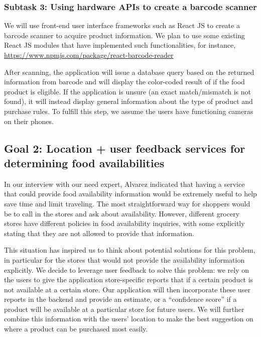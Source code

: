 \documentclass{article}
\begin{document}
\subsubsection*{Subtask 3: Using hardware APIs to create a barcode scanner}\label{sec:goal13}
We will use front-end user interface frameworks such as React JS to create a barcode scanner to acquire product information.  We plan to use some existing React JS modules that have implemented such functionalities, for instance, \href{https://www.npmjs.com/package/react-barcode-reader}{https://www.npmjs.com/package/react-barcode-reader}\par
After scanning, the application will issue a database query based on the returned information from barcode and will display the color-coded result of if the food product is eligible. If the application is unsure (an exact match/mismatch is not found), it will instead display general information about the type of product and purchase rules. To fulfill this step, we assume the users have functioning cameras on their phones.

\subsection*{Goal 2: Location + user feedback services for determining food availabilities}
\label{sec:goal2}
In our interview with our need expert, Alvarez indicated that having a service that could provide food availability information would be extremely useful to help save time and limit traveling. The most straightforward way for shoppers would be to call in the stores and ask about availability. However, different grocery stores have different policies in food availability inquiries, with some explicitly stating that they are not allowed to provide that information. \par
This situation has inspired us to think about potential solutions for this problem, in particular for the stores that would not provide the availability information explicitly. We decide to leverage user feedback to solve this problem: we rely on the users to give the application store-specific reports that if a certain product is not available at a certain store. Our application will then incorporate these user reports in the backend and provide an estimate, or a ``confidence score'' if a product will be available at a particular store for future users. We will further combine this information with the users’ location to make the best suggestion on where a product can be purchased most easily.\par
\end{document}
